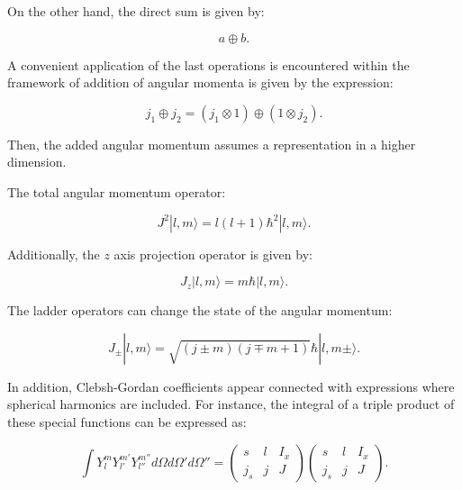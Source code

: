 \documentclass[openany]{book}
\begin{document}
On the other hand, the direct sum is given by:

\begin{equation} \label{eq:angularMomentum_tensorProduct}
	a \oplus b.
\end{equation}

A convenient application of the last operations is encountered  within the framework of addition of angular momenta is given by the expression: 

\begin{equation}\label{eq:angularMomentum_tensorProduct_addition}
	j_1 \oplus j_2 = (j_1 \otimes 1) \oplus  (1 \otimes j_2). 
\end{equation}

Then, the added angular momentum assumes a representation in a higher dimension. 

The total angular momentum operator:

\begin{equation}\label{eq:angularMomentum_J2}
	J^2|l, m \rangle  = l(l+1)\hbar^2| l, m \rangle. 
\end{equation}

Additionally, the $z$ axis projection operator is given by: 

\begin{equation}\label{eq:angularMomentum_Jz}
	J_z|l, m \rangle  =m \hbar |l, m \rangle. 
\end{equation}

The ladder operators can change the state of the angular momentum:

\begin{equation}\label{eq:angularMomentum_Jladder}
	J_\pm|l, m \rangle  = \sqrt{(j \pm m)(j \mp m + 1)} \hbar |l, m \pm \rangle. 
\end{equation}



In addition, Clebsh-Gordan coefficients appear connected with expressions where spherical harmonics are included. For instance, the integral of a triple product of these special functions can be expressed as: 

\begin{equation}  \label{eq:angularMomentum_ClebshGordan_sphericalHarmonics}
	\int Y_l^{m} Y_{l'}^{m'}Y_{l''}^{m''} d\Omega d\Omega ' d\Omega '' = 	\left(\begin{array}{ccc}
		s &	l &	I_x \\
		j_s & j & J
	\end{array}\right) \left(\begin{array}{ccc}
	s &	l &	I_x \\
	j_s & j & J
\end{array}\right). 
\end{equation}
\end{document}
